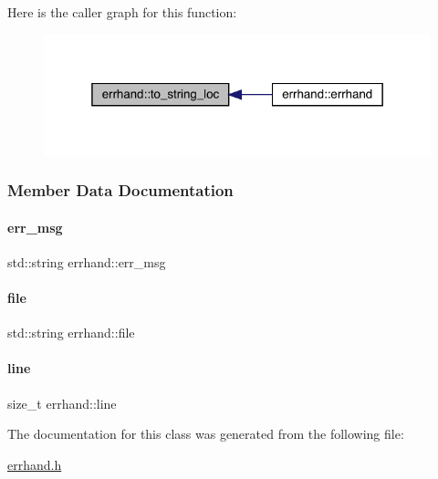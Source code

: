 Here is the caller graph for this function\+:\nopagebreak
\begin{figure}[H]
\begin{center}
\leavevmode
\includegraphics[width=319pt]{classerrhand_a930df1c197154853159683cb2ad55369_icgraph}
\end{center}
\end{figure}


\subsubsection{Member Data Documentation}
\mbox{\label{classerrhand_a2baa975c76a80afce9c97575c549058c}} 
\paragraph{\texorpdfstring{err\+\_\+msg}{err\_msg}}
{\footnotesize\ttfamily std\+::string errhand\+::err\+\_\+msg\hspace{0.3cm}{\ttfamily [private]}}

\mbox{\label{classerrhand_aed73d7a312fae4b4387d8d2487277a74}} 
\paragraph{\texorpdfstring{file}{file}}
{\footnotesize\ttfamily std\+::string errhand\+::file\hspace{0.3cm}{\ttfamily [private]}}

\mbox{\label{classerrhand_a3ddc204c758b97e7d1550019e4513f3b}} 
\paragraph{\texorpdfstring{line}{line}}
{\footnotesize\ttfamily size\+\_\+t errhand\+::line\hspace{0.3cm}{\ttfamily [private]}}



The documentation for this class was generated from the following file\+:\begin{DoxyCompactItemize}
\item 
\mbox{\hyperlink{errhand_8h}{errhand.\+h}}\end{DoxyCompactItemize}
